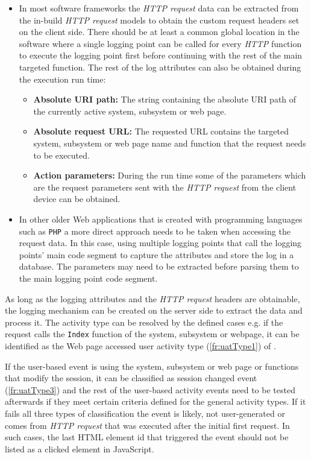 \begin{itemize}
	\item In most software frameworks the \textit{HTTP request} data can be extracted from the in-build \textit{HTTP request} models to obtain the custom request headers set on the client side. There should be at least a common global location in the software where a single logging point can be called for every \textit{HTTP} function to execute the logging point first before continuing with the rest of the main targeted function. The rest of the log attributes can also be obtained during the execution run time:
	\begin{itemize}
		\item \textbf{Absolute URI path:} The string containing the absolute URI path of the currently active system, subsystem or web page. 
		\item \textbf{Absolute request URL:} The requested URL contains the targeted system, subsystem or web page name and function that the request needs to be executed. 
		\item \textbf{Action parameters:} During the run time some of the parameters which are the request parameters sent with the \textit{HTTP request} from the client device can be obtained.
	\end{itemize}
	\item In other older Web applications that is created with programming languages such as \texttt{PHP} a more direct approach needs to be taken when accessing the request data. In this case, using multiple logging points that call the logging points' main code segment to capture the attributes and store the log in a database. The parameters may need to be extracted before parsing them to the main logging point code segment.
\end{itemize}

As long as the logging attributes and the \textit{HTTP request} headers are obtainable, the logging mechanism can be created on the server side to extract the data and process it. The activity type can be resolved by the defined cases e.g. if the request calls the \texttt{Index} function of the system, subsystem or webpage, it can be identified as the Web page accessed user activity type (\ref{fr:uatType1}) of .\par If the user-based event is using the system, subsystem or web page or functions that modify the session, it can be classified as session changed event (\ref{fr:uatType3}) and the rest of the user-based activity events need to be tested afterwards if they meet certain criteria defined for the general activity types. If it fails all three types of classification the event is likely, not user-generated or comes from \textit{HTTP request} that was executed after the initial first request. In such cases, the last HTML element id that triggered the event should not be listed as a clicked element in JavaScript.

